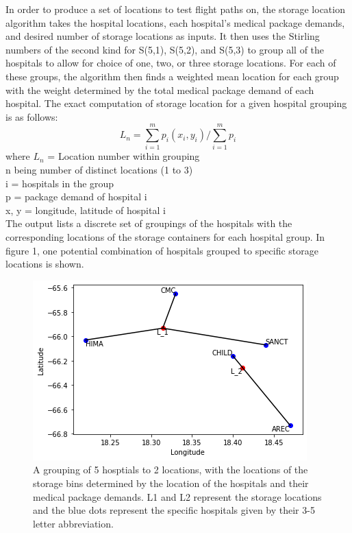 \documentclass[twocolumn,10pt]{asme2ej}
\begin{document}
In order to produce a set of locations to test flight paths on, the storage location algorithm takes the hospital locations, each hospital's medical package demands, and desired number of storage locations as inputs. It then uses the Stirling numbers of the second kind for S(5,1), S(5,2), and S(5,3) to group all of the hospitals to allow for choice of one, two, or three storage locations. For each of these groups, the algorithm then finds a weighted mean location for each group with the weight determined by the total medical package demand of each hospital. The exact computation of storage location for a given hospital grouping is as follows:
\[ 
L_n = \sum_{i=1}^{m} p_i(x_i, y_i) / \sum_{i=1}^{m} p_i 
\]
where $L_n$ = Location number within grouping \\
n being number of distinct locations (1 to 3) \\
i = hospitals in the group \\
p = package demand of hospital i \\
x, y = longitude, latitude of hospital i \\
The output lists a discrete set of groupings of the hospitals with the corresponding locations of the storage containers for each hospital group. In figure 1, one potential combination of hospitals grouped to specific storage locations is shown. 

\begin{figure}
	\centering
	\includegraphics[width=0.7\linewidth]{storage_fig}
	\caption[Fig 1]{A grouping of 5 hosptials to 2 locations, with the locations of the storage bins determined by the location of the hospitals and their medical package demands. L1 and L2 represent the storage locations and the blue dots represent the specific hospitals given by their 3-5 letter abbreviation.}
	\label{Fig 1}
\end{figure}
\end{document}
